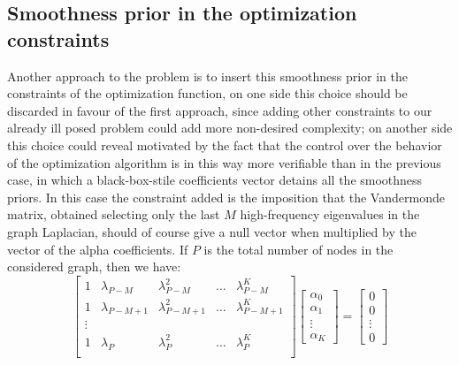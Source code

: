 \subsection{Smoothness prior in the optimization constraints}
Another approach to the problem is to insert this smoothness prior in the constraints of the optimization function, on one side this choice should be discarded in favour of the first approach, since adding other constraints to our already ill posed problem could add more non-desired complexity; on another side this choice could reveal motivated by the fact that the control over the behavior of the optimization algorithm is in this way more verifiable than in the previous case, in which a black-box-stile coefficients vector detains all the smoothness priors. In this case the constraint added is the imposition that the Vandermonde matrix, obtained selecting only the last $M$ high-frequency eigenvalues in the graph Laplacian, should of course give a null vector when multiplied by the vector of the alpha coefficients. If $P$ is the total number of nodes in the considered graph, then we have:
\begin{equation}
\begin{bmatrix}
1 & \lambda_{P-M} & \lambda_{P-M}^2 & \dots & \lambda_{P-M}^{K} \\
1 & \lambda_{P-M+1} & \lambda_{P-M+1}^2 & \dots & \lambda_{P-M+1}^{K} \\
\vdots & & \\
1 & \lambda_P & \lambda_P^2 & \dots & \lambda_P^K \\
\end{bmatrix}
\begin{bmatrix}
\alpha_0 \\
\alpha_1 \\
\vdots \\
\alpha_K
\end{bmatrix}
=
\begin{bmatrix}
0\\
0\\
\vdots\\
0
\end{bmatrix}
\end{equation}

